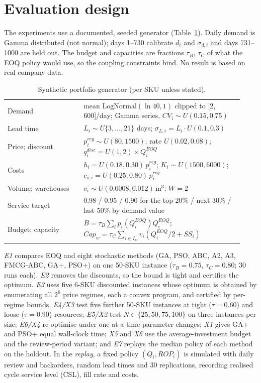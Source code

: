 \documentclass[preprint,12pt,authoryear]{elsarticle}
\begin{document}
\section{Evaluation design}\label{sec:design}

The experiments use a documented, seeded generator (Table~\ref{tab:gen}). Daily demand is Gamma distributed (not normal); days 1--730 calibrate $d_i$ and $\sigma_{d,i}$ and days 731--1000 are held out. The budget and capacities are fractions $\tau_B$, $\tau_C$ of what the EOQ policy would use, so the coupling constraints bind. No result is based on real company data.

\begin{table}[!t]
\centering\footnotesize
\caption{Synthetic portfolio generator (per SKU unless stated).}\label{tab:gen}
\begin{tabular}{p{0.3\linewidth}p{0.63\linewidth}}
\toprule
Demand & mean $\mathrm{LogNormal}(\ln40,1)$ clipped to [2, 600]/day; Gamma series, $CV_i\sim U(0.15,0.75)$ \\
Lead time & $L_i\sim U\{3,\dots,21\}$ days; $\sigma_{L,i}=L_i\cdot U(0.1,0.3)$ \\
Price; discount & $p^{reg}_i\sim U(80,1500)$; rate $U(0.02,0.08)$; $q^{disc}_i=U(1,2)\times Q^{EOQ}_i$ \\
Costs & $h_i=U(0.18,0.30)\,p^{reg}_i$; $K_i\sim U(1500,6000)$; $c_{s,i}=U(0.25,0.80)\,p^{reg}_i$ \\
Volume; warehouses & $v_i\sim U(0.0008,0.012)\,\mathrm{m}^3$; $W=2$ \\
Service target & 0.98 / 0.95 / 0.90 for the top 20\% / next 30\% / last 50\% by demand value \\
Budget; capacity & $B=\tau_B\sum_ip_i(Q^{EOQ}_i)Q^{EOQ}_i$; $Cap_w=\tau_C\sum_{i\in I_w}v_i(Q^{EOQ}_i/2+SS_i)$ \\
\bottomrule
\end{tabular}
\end{table}

\emph{E1} compares EOQ and eight stochastic methods (GA, PSO, ABC, A2, A3, FMCG-ABC, GA+, PSO+) on one 50-SKU instance ($\tau_B=0.75$, $\tau_C=0.80$; 30 runs each). \emph{E2} removes the discounts, so the bound is tight and certifies the optimum. \emph{E3} uses five 6-SKU discounted instances whose optimum is obtained by enumerating all $2^6$ price regimes, each a convex program, and certified by per-regime bounds. \emph{E4/X3} test five further 50-SKU instances at tight ($\tau=0.60$) and loose ($\tau=0.90$) resources; \emph{E5/X2} test $N\in\{25,50,75,100\}$ on three instances per size; \emph{E6/X4} re-optimise under one-at-a-time parameter changes; \emph{X1} gives GA+ and PSO+ equal wall-clock time; \emph{X5} and \emph{X6} use the average-investment budget and the review-period variant; and \emph{E7} replays the median policy of each method on the holdout. In the \emph{replay}, a fixed policy $(Q_i,ROP_i)$ is simulated with daily review and backorders, random lead times and 30 replications, recording realised cycle service level (CSL), fill rate and costs.
\end{document}
